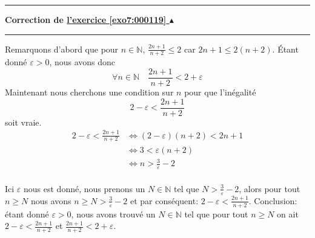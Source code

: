 \documentclass[11pt,a4paper]{article}
\newcommand{\Nn}{\mathbb{N}} \newcommand{\N}{\mathbb{N}}
\renewcommand{\epsilon}{\varepsilon}
\newcounter{exo}
\newcommand{\correction}[1]{\hypertarget{cor7:#1}{}\label{cor7:#1}{\bf Correction de \hyperlink{exo7:#1}{l'exercice \ref{exo7:#1} $\blacktriangle$}}\vspace{1mm}\hrule\vspace{1mm}}
\newcommand{\fincorrection}{\vspace{1mm}\hrule\vspace*{7mm}}
\begin{document}
\fincorrection
\correction{000119}
Remarquons d'abord que pour $n \in \Nn$, $\frac{2n+1}{n+2} \leq 2$
car $2n+1 \leq 2(n+2)$.
\'Etant donn\'e $\epsilon > 0$, nous avons donc 
$$\forall n \in \Nn \quad \frac{2n+1}{n+2} < 2 + \epsilon$$
Maintenant nous cherchons une condition sur $n$ pour que
l'in\'egalit\'e 
$$2-\epsilon < \frac{2n + 1}{n + 2}$$
soit vraie.
\begin{align*}
2-\epsilon < \frac{2n + 1}{n + 2} 
    &\Leftrightarrow (2-\epsilon)(n+2) < 2n+1 \\
    &\Leftrightarrow 3  < \epsilon (n+2) \\
   &\Leftrightarrow n >  \frac{3}{\epsilon}-2 \\
\end{align*}

Ici $\epsilon$ nous est donn\'e, nous prenons un $N\in \Nn$ tel
que $N > \frac{3}{\epsilon}-2$, alors pour tout $n \geq N$ nous avons
$n \geq N >  \frac{3}{\epsilon}-2$ et par
cons\'equent: $2-\epsilon < \frac{2n + 1}{n + 2}$.
Conclusion: \'etant donn\'e $\epsilon > 0$, nous avons trouv\'e un 
$N\in \Nn$ tel que pour tout $n \geq N$ on ait
$2-\epsilon < \frac{2n + 1}{n + 2}$ et $\frac{2n+1}{n+2} < 2 + \epsilon$.
\end{document}
